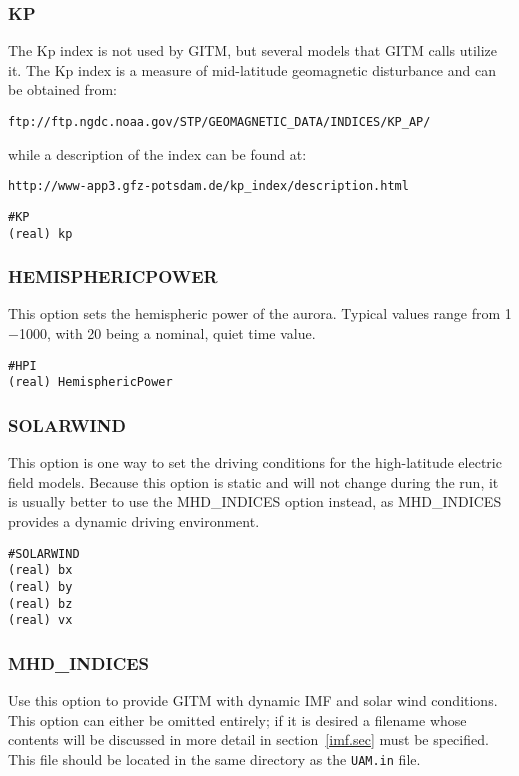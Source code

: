 \subsubsection{KP}
\label{kp.sec}

The Kp index is not used by GITM, but several models that GITM calls utilize it.  The Kp index is a measure of mid-latitude geomagnetic disturbance and can be obtained from:

 {\tt ftp://ftp.ngdc.noaa.gov/STP/GEOMAGNETIC\_DATA/INDICES/KP\_AP/} 
 
 \noindent while a description of the index can be found at:
 
 {\tt http://www-app3.gfz-potsdam.de/kp\_index/description.html}

\begin{verbatim}
#KP
(real) kp  
\end{verbatim}

\subsubsection{HEMISPHERICPOWER}
\label{hemisphericpower.sec}

This option sets the hemispheric power of the aurora.  Typical values range from 1$-$1000, with 20 being a nominal, quiet time value.

\begin{verbatim}
#HPI
(real) HemisphericPower
\end{verbatim}

\subsubsection{SOLARWIND}
\label{solarwind.sec}

This option is one way to set the driving conditions for the high-latitude electric field models.  Because this option is static and will not change during the run, it is usually better to use the MHD\_INDICES option instead, as MHD\_INDICES provides a dynamic driving environment.

\begin{verbatim}
#SOLARWIND
(real) bx  
(real) by  
(real) bz  
(real) vx  
\end{verbatim}

\subsubsection{MHD\_INDICES}
\label{mhdindices.sec}

Use this option to provide GITM with dynamic IMF and solar wind conditions.  This option can either be omitted entirely; if it is desired a filename whose contents will be discussed in more detail in section~\ref{imf.sec} must be specified.  This file should be located in the same directory as the {\tt UAM.in} file.

